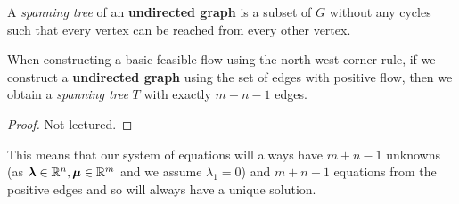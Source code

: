 \documentclass[../main.tex]{subfiles}
\begin{document}
\begin{definition}
  A \textit{spanning tree} of an \textbf{undirected graph} is a subset of $G$ without any cycles such that every vertex can be reached from every other vertex.
\end{definition}
\begin{theorem}
  When constructing a basic feasible flow using the north-west corner rule, if we construct a \textbf{undirected graph} using the set of edges with positive flow, then we obtain a \textit{spanning tree} $T$ with exactly $m + n - 1$ edges.
\end{theorem}
\begin{proof}
  Not lectured.
\end{proof}
This means that our system of equations will always have $m + n - 1$ unknowns (as $\mathbf{\bm{\lambda}} \in \mathbb{R}^{n}, \mathbf{\bm{\mu}} \in \mathbb{R}^{m}$ and we assume $\lambda_1 = 0$) and $m + n - 1$ equations from the positive edges and so will always have a unique solution.
\end{document}
